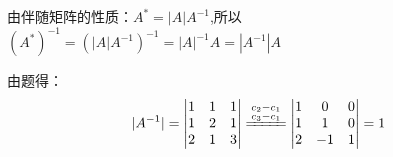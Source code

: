 \documentclass{article}
\begin{document}
\begin{jie}
由伴随矩阵的性质：$A^{*}=|A|A^{-1}$,所以$(A^*)^{-1}=(|A|A^{-1})^{-1}=|A|^{-1}A=|A^{-1}|A$

由题得：
\begin{equation*}|A^{-1}|=
  \begin{vmatrix}
  1 & 1 & 1 \\
  1 & 2 & 1 \\
  2 & 1 & 3
  \end{vmatrix}\xlongequal{\substack{c_{2}-c_{1}\\c_{3}-c_{1}}}
  \begin{vmatrix}
  1 & 0 & 0 \\
  1 & 1 & 0 \\
  2 & -1 & 1
  \end{vmatrix}=1
\end{equation*}


\end{jie}
\end{document}

